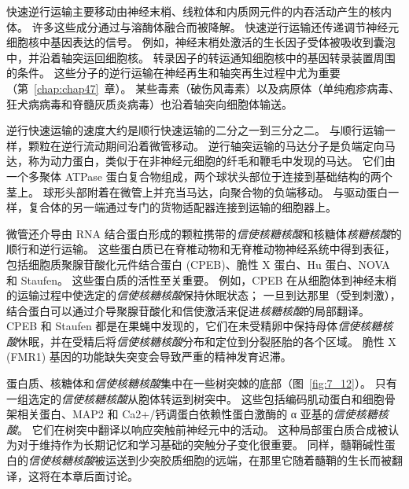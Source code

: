 快速逆行运输主要移动由神经末梢、线粒体和内质网元件的内吞活动产生的核内体。
许多这些成分通过与溶酶体融合而被降解。
快速逆行运输还传递调节神经元细胞核中基因表达的信号。
例如，神经末梢处激活的生长因子受体被吸收到囊泡中，并沿着轴突运回细胞核。
转录因子的转运通知细胞核中的基因转录装置周围的条件。
这些分子的逆行运输在神经再生和轴突再生过程中尤为重要（第~\ref{chap:chap47}~章）。 
某些毒素（破伤风毒素）以及病原体（单纯疱疹病毒、狂犬病病毒和脊髓灰质炎病毒）也沿着轴突向细胞体输送。


逆行快速运输的速度大约是顺行快速运输的二分之一到三分之二。
与顺行运输一样，颗粒在逆行流动期间沿着微管移动。
逆行轴突运输的马达分子是负端定向马达，称为动力蛋白，类似于在非神经元细胞的纤毛和鞭毛中发现的马达。 它们由一个多聚体 ATPase 蛋白复合物组成，两个球状头部位于连接到基础结构的两个茎上。
球形头部附着在微管上并充当马达，向聚合物的负端移动。
与驱动蛋白一样，复合体的另一端通过专门的货物适配器连接到运输的细胞器上。


微管还介导由 RNA 结合蛋白形成的颗粒携带的\textit{信使核糖核酸}和核糖体\textit{核糖核酸}的顺行和逆行运输。
这些蛋白质已在脊椎动物和无脊椎动物神经系统中得到表征，包括细胞质聚腺苷酸化元件结合蛋白 (CPEB)、脆性 X 蛋白、Hu 蛋白、NOVA 和 Staufen。
这些蛋白质的活性至关重要。
例如，CPEB 在从细胞体到神经末梢的运输过程中使选定的\textit{信使核糖核酸}保持休眠状态；
一旦到达那里（受到刺激），结合蛋白可以通过介导聚腺苷酸化和信使激活来促进\textit{核糖核酸}的局部翻译。
CPEB 和 Staufen 都是在果蝇中发现的，它们在未受精卵中保持母体\textit{信使核糖核酸}休眠，并在受精后将\textit{信使核糖核酸}分布和定位到分裂胚胎的各个区域。
脆性 X (FMR1) 基因的功能缺失突变会导致严重的精神发育迟滞。


蛋白质、核糖体和\textit{信使核糖核酸}集中在一些树突棘的底部（图~\ref{fig:7_12}）。
只有一组选定的\textit{信使核糖核酸}从胞体转运到树突中。
这些包括编码肌动蛋白和细胞骨架相关蛋白、MAP2 和 Ca2+/钙调蛋白依赖性蛋白激酶的 α 亚基的\textit{信使核糖核酸}。
它们在树突中翻译以响应突触前神经元中的活动。
这种局部蛋白质合成被认为对于维持作为长期记忆和学习基础的突触分子变化很重要。
同样，髓鞘碱性蛋白的\textit{信使核糖核酸}被运送到少突胶质细胞的远端，在那里它随着髓鞘的生长而被翻译，这将在本章后面讨论。


